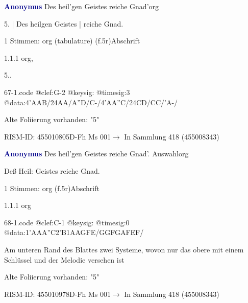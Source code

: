 \documentclass[twocolumn]{book}
\begin{document}
\par \vspace{7pt} \textcolor{darkblue}{\textbf{Anonymus  }}\hfillplus{\textbf{[67]}}\newline Des heil'gen Geistes reiche Gnad'\newline org
\par \begin{itshape}[f.5r, at left:] 5. | Des heilgen Geistes | reiche Gnad.\end{itshape} 
\par \textcolor{darkblue}{}  1 Stimmen: org (tabulature)  (f.5r)\newline Abschrift
\par 1.1.1  org, \begin{itshape}5..\end{itshape}  
\begin{filecontents*}{67-1.code}
@clef:G-2
@keysig:
@timesig:3
@data:4'AAB/24AA/A''D/C-/4'AA''C/24CD/CC/'A-/
\end{filecontents*}
\newline
%
\par Alte Foliierung vorhanden: "5"
\par RISM-ID: 455010805\newline D-Fh  Ms 001\newline $\rightarrow$ In Sammlung 418 (455008343)
      
\par \vspace{7pt} \textcolor{darkblue}{\textbf{Anonymus  }}\hfillplus{\textbf{[68]}}\newline Des heil'gen Geistes reiche Gnad'. Auswahl\newline org
\par \begin{itshape} Deß Heil: Geistes reiche Gnad.\end{itshape} 
\par \textcolor{darkblue}{}  1 Stimmen: org  (f.5r)\newline Abschrift
\par 1.1.1  org  
\begin{filecontents*}{68-1.code}
@clef:C-1
@keysig:
@timesig:0
@data:1'AAA''C2'B1AAGFE/GGFGAFEF/
\end{filecontents*}
\newline
%
\par Am unteren Rand des Blattes zwei Systeme, wovon nur das obere mit einem Schlüssel und der Melodie versehen ist
\par Alte Foliierung vorhanden: "5"
\par RISM-ID: 455010978\newline D-Fh  Ms 001\newline $\rightarrow$ In Sammlung 418 (455008343)
      
\end{document}
